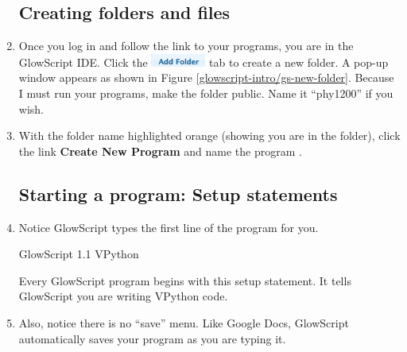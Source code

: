 \begin{enumerate}

	\subsection*{Creating folders and files}
	
	\item Once you log in and follow the link to your programs, you are in the GlowScript IDE. Click the \includegraphics[scale=0.75]{glowscript-intro/gs-add-folder} tab to create a new folder. A pop-up window appears as shown in Figure \ref{glowscript-intro/gs-new-folder}. Because I must run your programs, make the folder public. Name it ``phy1200'' if you wish.
	
	


	\item With the folder name highlighted orange (showing you are in the folder), click the link {\bf Create New Program} and name the program .
	
		
	\subsection*{Starting a program:  Setup statements}
	
	\item Notice GlowScript types the first line of the program for you.
	
\begin{myvpython}
GlowScript 1.1 VPython
\end{myvpython}
	
Every GlowScript program begins with this setup statement. It tells GlowScript you are writing VPython code.

	\item Also, notice there is no ``save'' menu. Like Google Docs, GlowScript automatically saves your program as you are typing it. 
	

\end{enumerate}
